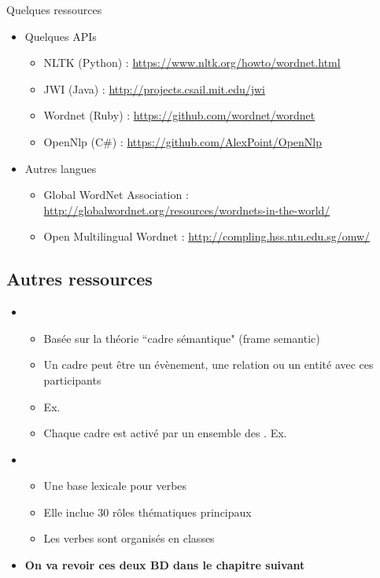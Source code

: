 \documentclass{KodeBook}
\begin{document}
Quelques ressources
\begin{itemize}
	\item Quelques APIs
	\begin{itemize}
		\item NLTK (Python) : \url{https://www.nltk.org/howto/wordnet.html}
		\item JWI (Java) : \url{http://projects.csail.mit.edu/jwi}
		\item Wordnet (Ruby) : \url{https://github.com/wordnet/wordnet}
		\item OpenNlp (C\#) : \url{https://github.com/AlexPoint/OpenNlp}
	\end{itemize}
	\item Autres langues
	\begin{itemize}
		\item Global WordNet Association : \url{http://globalwordnet.org/resources/wordnets-in-the-world/}
		\item Open Multilingual Wordnet : \url{http://compling.hss.ntu.edu.sg/omw/}
	\end{itemize}
\end{itemize}

\subsection{Autres ressources}

\begin{itemize}
	\item {} 
	\begin{itemize}
		\item Basée sur la théorie ``cadre sémantique" (frame semantic)
		\item Un cadre peut être un évènement, une relation ou un entité avec ces participants 
		\item Ex. 
		\item Chaque cadre est activé par un ensemble des . Ex. 
	\end{itemize}
	\item {} 
	\begin{itemize}
		\item Une base lexicale pour verbes
		\item Elle inclue 30 rôles thématiques principaux 
		\item Les verbes sont organisés en classes
	\end{itemize}
	\item \textbf{On va revoir ces deux BD dans le chapitre suivant}
\end{itemize}
\end{document}
